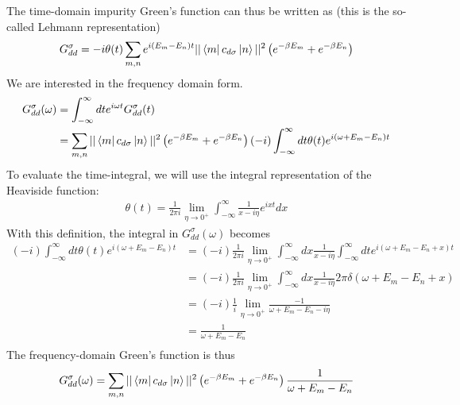 \documentclass[12pt,twoside]{report}
\numberwithin{equation}{section}
\begin{document}
The time-domain impurity Green's function can thus be written as (this is the so-called Lehmann representation)
\begin{equation}\begin{aligned}
	G_{dd}^\sigma = -i\theta(t)\sum_{m,n}e^{i\left( E_m - E_n \right)  t}||\bra{m}c_{d\sigma}\ket{n}||^2\left( e^{-\beta E_m} + e^{-\beta E_n}\right)\\
\end{aligned}\end{equation}
We are interested in the frequency domain form.
\begin{equation}\begin{aligned}
	G_{d d}^\sigma(\omega) &= \int_{-\infty}^\infty dt e^{i \omega t}G_{d d}^\sigma(t) \\
			       &= \sum_{m,n}||\bra{m}c_{d\sigma}\ket{n}||^2\left( e^{-\beta E_m} + e^{-\beta E_n}\right)\left(-i\right)\int_{-\infty}^\infty dt \theta(t)e^{i\left( \omega + E_m - E_n \right)t}
\end{aligned}\end{equation}
To evaluate the time-integral, we will use the integral representation of the Heaviside function:
\begin{equation}\begin{aligned}
	\theta(t) = \frac{1}{2\pi i}\lim_{\eta \to 0^+} \int_{-\infty}^\infty \frac{1}{x- i\eta}e^{ixt}dx
\end{aligned}\end{equation}
With this definition, the integral in \(G_{dd}^\sigma(\omega)\) becomes
\begin{equation}\begin{aligned}
	\left(-i\right)\int_{-\infty}^\infty dt \theta(t)e^{i\left( \omega + E_m - E_n \right)t} &= \left(-i\right)\frac{1}{2\pi i}\lim_{\eta \to 0^+} \int_{-\infty}^\infty dx\frac{1}{x- i\eta}\int_{-\infty}^\infty dt e^{i\left( \omega + E_m - E_n + x\right)t} \\
									     &=\left(-i\right)\frac{1}{2\pi i}\lim_{\eta \to 0^+} \int_{-\infty}^\infty dx\frac{1}{x- i\eta} 2\pi \delta\left( \omega + E_m - E_n + x\right) \\
									     &=\left(-i\right)\frac{1}{i}\lim_{\eta \to 0^+} \frac{-1}{\omega + E_m - E_n- i\eta} \\
									     &=\frac{1}{\omega + E_m - E_n} \\
\end{aligned}\end{equation}
The frequency-domain Green's function is thus
\begin{equation}\begin{aligned}
	G_{d d}^\sigma(\omega) = \sum_{m,n}||\bra{m}c_{d\sigma}\ket{n}||^2\left( e^{-\beta E_m} + e^{-\beta E_n}\right)\frac{1}{\omega + E_m - E_n}
\end{aligned}\end{equation}
\end{document}
